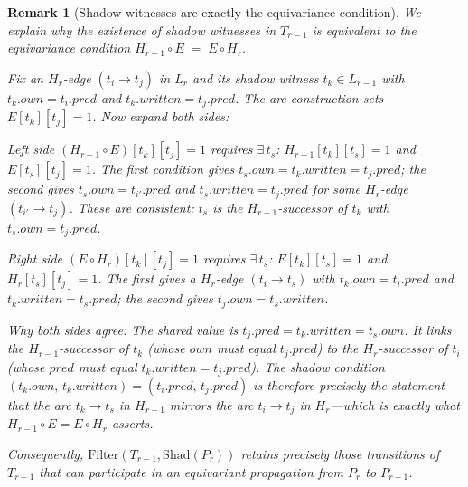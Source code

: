 \documentclass{article}
\newtheorem{remark}{Remark}
\newcommand{\Shad}{\mathrm{Shad}}
\newcommand{\Filter}{\mathrm{Filter}}
\newcommand{\own}{\mathit{own}}
\newcommand{\writ}{\mathit{written}}
\newcommand{\pred}{\mathit{pred}}
\begin{document}
\begin{remark}[Shadow witnesses are exactly the equivariance condition]
\label{rem:equiv}
We explain why the existence of shadow witnesses in $T_{r-1}$ is
equivalent to the equivariance condition
$H_{r-1}\circ E \;=\; E\circ H_r$.

Fix an $H_r$-edge $(t_i\!\to\!t_j)$ in $L_r$ and its shadow witness
$t_k\in L_{r-1}$ with $t_k.\own=t_i.\pred$ and $t_k.\writ=t_j.\pred$.
The arc construction sets $E[t_k][t_j]=1$.  Now expand both sides:

\emph{Left side $(H_{r-1}\circ E)[t_k][t_j]=1$}
requires $\exists\,t_s$: $H_{r-1}[t_k][t_s]=1$ and $E[t_s][t_j]=1$.
The first condition gives $t_s.\own = t_k.\writ = t_j.\pred$; the
second gives $t_s.\own = t_{i'}.\pred$ and $t_s.\writ = t_j.\pred$
for some $H_r$-edge $(t_{i'}\!\to\!t_j)$.  These are consistent: $t_s$
is the $H_{r-1}$-successor of $t_k$ with $t_s.\own = t_j.\pred$.

\emph{Right side $(E\circ H_r)[t_k][t_j]=1$}
requires $\exists\,t_s$: $E[t_k][t_s]=1$ and $H_r[t_s][t_j]=1$.
The first gives a $H_r$-edge $(t_i\!\to\!t_s)$ with $t_k.\own=t_i.\pred$
and $t_k.\writ=t_s.\pred$; the second gives $t_j.\own=t_s.\writ$.

\emph{Why both sides agree:}
The shared value is $t_j.\pred = t_k.\writ = t_s.\own$.  It links the
$H_{r-1}$-successor of $t_k$ (whose $\own$ must equal $t_j.\pred$) to
the $H_r$-successor of $t_i$ (whose $\pred$ must equal $t_k.\writ =
t_j.\pred$).  The shadow condition $(t_k.\own,\,t_k.\writ) =
(t_i.\pred,\,t_j.\pred)$ is therefore precisely the statement that the
arc $t_k\!\to\!t_s$ in $H_{r-1}$ mirrors the arc $t_i\!\to\!t_j$ in
$H_r$---which is exactly what $H_{r-1}\circ E = E\circ H_r$ asserts.

Consequently, $\Filter(T_{r-1},\Shad(P_r))$ retains precisely those
transitions of $T_{r-1}$ that can participate in an equivariant
propagation from $P_r$ to $P_{r-1}$.
\end{remark}
\end{document}
